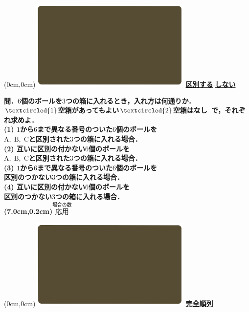 \documentclass[10pt,
fleqn,
dvipdfmx,
uplatex
]{jsarticle}
\def\maru#1{\textcircled{\scriptsize#1}}%
\begin{document}
\at(0cm,0cm){\includegraphics[width=8cm,bb=0 0 1920 1080]{./youtube/thumbnails/templates/smart_background/場合の数.jpeg}}
{\color{orange}\bf\boldmath\huge\underline{区別する$\cdot$しない}}\vspace{0.3zw}

\scriptsize 
\bf\boldmath 問．$6$個のボールを$3$つの箱に入れるとき，入れ方は何通りか．\vspace{0.1zw}\\
\hfill $\maru{1}$空箱があってもよい$\maru{2}$空箱はなし\ で，それぞれ求めよ．\vspace{0.1zw}\\
(1)  $1$から$6$まで異なる番号のついた$6$個のボールを\vspace{0.1zw}\\
\hfill $\text{A},\;\text{B},\;\text{C}$と区別された$3$つの箱に入れる場合．\vspace{0.1zw}\\
(2)  互いに区別の付かない$6$個のボールを\vspace{0.1zw}\\
\hfill $\text{A},\;\text{B},\;\text{C}$と区別された$3$つの箱に入れる場合．\vspace{0.1zw}\\
(3)  $1$から$6$まで異なる番号のついた$6$個のボールを\vspace{0.1zw}\\
\hfill 区別のつかない$3$つの箱に入れる場合．\vspace{0.1zw}\\
(4)  互いに区別の付かない$6$個のボールを\vspace{0.1zw}\\
\hfill 区別のつかない$3$つの箱に入れる場合．\vspace{0.1zw}\\

\at(7.0cm,0.2cm){\small\color{bradorange}$\overset{\text{場合の数}}{\text{応用}}$}


\newpage



\at(0cm,0cm){\includegraphics[width=8cm,bb=0 0 1920 1080]{./youtube/thumbnails/templates/smart_background/場合の数.jpeg}}
{\color{orange}\bf\boldmath\huge\underline{完全順列}}\vspace{0.3zw}
\end{document}
